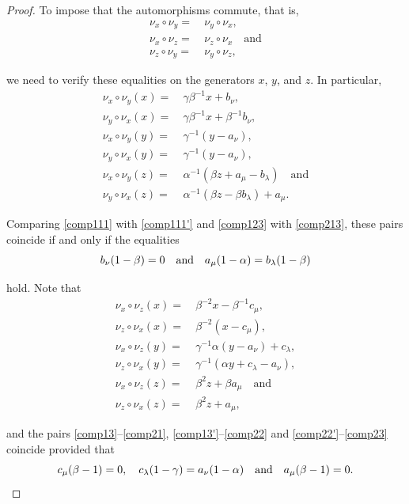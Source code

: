 \documentclass{amsart}
\theoremstyle{definition}
\theoremstyle{remark}
\numberwithin{equation}{section}
\begin{document}
\begin{proof}
To impose that the automorphisms commute, that is, 
\begin{align}\label{commuauto}
   \nu_{x} \circ \nu_{y} = &\ \nu_{y} \circ \nu_{x}, \\
   \nu_{x} \circ \nu_{z} = &\  \nu_{z} \circ \nu_{x} \quad \text{and} \\
   \nu_{z} \circ \nu_{y} = &\ \nu_{y} \circ \nu_{z},
\end{align}

we need to verify these equalities on the generators $x$, $y$, and $z$. In particular,
\begin{align}
\nu_{x} \circ \nu_{y}(x) = &\ \gamma \beta^{-1}x+b_{\nu}, \label{comp111} \\
\nu_{y} \circ \nu_{x}(x) = &\ \gamma\beta^{-1}x+\beta^{-1}b_{\nu}, \label{comp111'} \\  
\nu_{x} \circ \nu_{y}(y) = &\ \gamma^{-1}(y-a_{\nu}), \\
\nu_{y} \circ \nu_{x}(y) = &\ \gamma^{-1}(y-a_{\nu}), \label{comp12} \\
 \nu_{x} \circ \nu_{y}(z) = &\ \alpha^{-1}(\beta z+a_{\mu}-b_{\lambda}) \quad \text{and} \label{comp123} \\
 \nu_{y} \circ \nu_{x}(z) = &\ \alpha^{-1}(\beta z -\beta b_{\lambda})+a_{\mu}. \label{comp213}
\end{align}

Comparing \eqref{comp111} with \eqref{comp111'} and \eqref{comp123} with \eqref{comp213}, these pairs coincide if and only if the equalities
$$
b_{\nu}(1-\beta)=0 \quad {\rm and}\quad a_{\mu}(1-\alpha)=b_{\lambda}(1-\beta)
$$

hold. Note that 
\begin{align}
    \nu_{x} \circ \nu_{z}(x) = &\ \beta^{-2}x-\beta^{-1}c_{\mu}, \label{comp13}\\
    \nu_{z} \circ \nu_{x}(x) = &\ \beta^{-2}(x-c_{\mu}), \label{comp21} \\
    \nu_{x} \circ \nu_{z}(y) = &\ \gamma^{-1}\alpha (y- a_{\nu})+c_{\lambda}, \label{comp13'}\\
    \nu_{z} \circ \nu_{x}(y) = &\ \gamma^{-1}(\alpha y +c_{\lambda} - a_{\nu}), \label{comp22} \\
    \nu_{x} \circ \nu_{z}(z) = &\ \beta^2z+\beta a_{\mu} \quad \text{and} \label{comp22'} \\
    \nu_{z} \circ \nu_{x}(z) = &\ \beta^2z+a_{\mu},  \label{comp23}
\end{align}

and the pairs \eqref{comp13}--\eqref{comp21}, \eqref{comp13'}--\eqref{comp22} and \eqref{comp22'}--\eqref{comp23} coincide provided that 
$$
c_{\mu}(\beta-1)=0,\quad c_{\lambda}(1-\gamma)=a_{\nu}(1-\alpha) \quad {\rm and} \quad a_{\mu}(\beta-1)=0.
$$


\end{proof}
\end{document}
